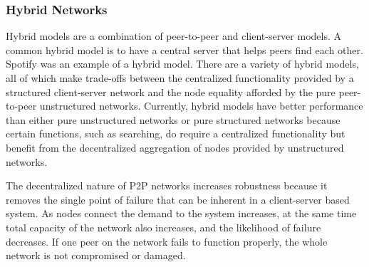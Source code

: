 \subsubsection{Hybrid Networks}
\vspace{12pt}
Hybrid models are a combination of peer-to-peer and client-server models. A common hybrid model is to have a central server that helps peers find each other. Spotify was an example of a hybrid model\cite{paper_compare_adhoc}. There are a variety of hybrid models, all of which make trade-offs between the centralized functionality provided by a structured client-server network and the node equality afforded by the pure peer-to-peer unstructured networks. Currently, hybrid models have better performance than either pure unstructured networks or pure structured networks because certain functions, such as searching, do require a centralized functionality but benefit from the decentralized aggregation of nodes provided by unstructured networks.

\vspace{12pt}

The decentralized nature of P2P networks increases robustness because it removes the single point of failure that can be inherent in a client-server based system. As nodes connect the demand to the system increases, at the same time total capacity of the network also increases, and the likelihood of failure decreases. If one peer on the network fails to function properly, the whole network is not compromised or damaged. 
\vspace{12pt}


